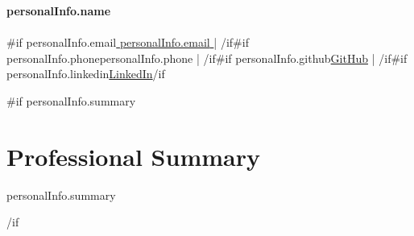 \documentclass[10pt, a4paper]{article}
\begin{document}
\begin{center}
    {\Huge \bfseries \color{primary} {{{personalInfo.name}}} }\\[4pt]
    \textcolor{accent}{}\\[4pt]
    {{#if personalInfo.email}}\href{mailto:{{{personalInfo.email}}} }{ {{{personalInfo.email}}} } | {{/if}}{{#if personalInfo.phone}}{{{personalInfo.phone}}} | {{/if}}{{#if personalInfo.github}}\href{ {{{personalInfo.github}}} }{GitHub} | {{/if}}{{#if personalInfo.linkedin}}\href{ {{{personalInfo.linkedin}}} }{LinkedIn}{{/if}}
\end{center}

\vspace{10pt}

{{#if personalInfo.summary}}
\section*{Professional Summary}
{{{personalInfo.summary}}}

\vspace{10pt}
{{/if}}
\end{document}
